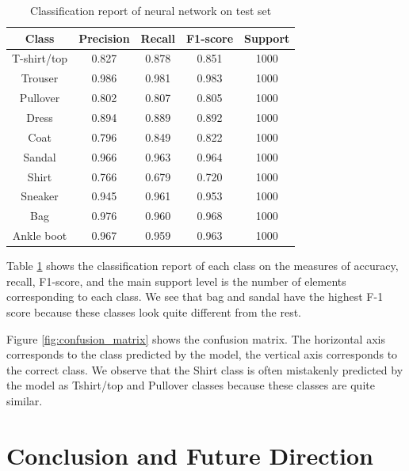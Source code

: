 \documentclass[14pt, a4paper]{article}
\numberwithin{equation}{section}
\numberwithin{algorithm}{section}
\numberwithin{figure}{section}
\begin{document}
\begin{table} [h!]
  \centering
  \begin{tabular}{ || c | c | c | c | c|| }
  \hline
  Class & Precision & Recall & F1-score & Support \\ [0.5 ex]
  \hline \hline
  T-shirt/top & 0.827 & 0.878 & 0.851 & 1000 \\ \hline
  Trouser & 0.986 & 0.981 & 0.983 & 1000  \\ \hline
  Pullover & 0.802 & 0.807 & 0.805 & 1000 \\ \hline
  Dress & 0.894 & 0.889 & 0.892 & 1000 \\ \hline
  Coat & 0.796 & 0.849 & 0.822 & 1000 \\ \hline
  Sandal & 0.966 &0.963 & 0.964 & 1000\\ \hline
  Shirt & 0.766 & 0.679 & 0.720 & 1000\\ \hline 
  Sneaker & 0.945 & 0.961 & 0.953 & 1000 \\ \hline
  Bag &  0.976 & 0.960 & 0.968 & 1000 \\ \hline
  Ankle boot & 0.967 & 0.959 & 0.963 & 1000 \\ [1ex]
  \hline
  \end{tabular}
  \caption{Classification report of neural network on test set}
  \label{table:metrics}
\end{table}

Table \ref{table:metrics} shows the classification report of each class on the measures of accuracy, recall, F1-score, and the main support level is the number of elements corresponding to each class. 
We see that bag and sandal have the highest F-1 score because these classes look quite different from the rest.

Figure \ref{fig:confusion_matrix} shows the confusion matrix. 
The horizontal axis corresponds to the class predicted by the model, the vertical axis corresponds to the correct class. 
We observe that the Shirt class is often mistakenly predicted by the model as Tshirt/top and Pullover classes because these classes are quite similar.

\section{Conclusion and Future Direction}
\end{document}

